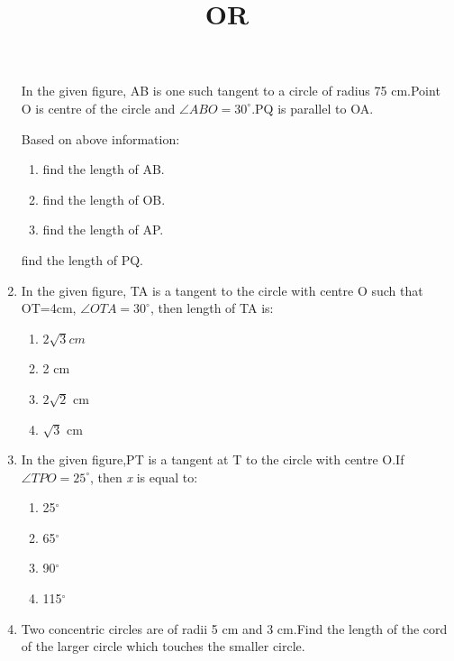 \documentclass[12pt,A4 paper]{article}
\begin{document}
\begin{enumerate}
In the given figure, AB is one such tangent to a circle of radius 75 cm.Point O is centre of the circle and $\angle ABO= 30^{\circ}$.PQ is parallel to OA.



\begin{figure}[ht]
	        \centering
	        
		\caption{}
		\label{fig:7}
        \end{figure}

     
Based on above information:

           \begin{enumerate}
             \item find the length of AB.
             \item find the length of OB.
             \item find the length of AP.
         \end{enumerate}
\begin{center}
\title{OR}
\end{center}
find the length of PQ.\\

\item In the given figure, TA is a tangent to the circle with centre O such that OT=4cm, $\angle OTA= 30 ^{\circ}$, then length of TA is:
      \begin{enumerate}
          \item $2\sqrt3 cm$
          \item 2 cm
          \item $2\sqrt2$ cm
          \item $\sqrt3$ cm
      \end{enumerate}




  \begin{figure}[h]
	\centering
	
	\caption{}
	\label{fig:8}
  \end{figure}
\pagebreak



\item In the given figure,PT is a tangent at T to the circle with centre O.If $\angle TPO=25^{\circ}$, then \textit{x} is equal to:
   \begin{enumerate}
       \item 25$^{\circ}$
       \item 65$^{\circ}$  
       \item 90$^{\circ}$
       \item 115$^{\circ}$
       
   \end{enumerate}




\begin{figure}[h]
	        \centering
	        
		\caption{}
		\label{fig:9}
\end{figure}
\pagebreak



\item Two concentric circles are of radii 5 cm and 3 cm.Find the length of the cord of the larger circle which touches the smaller circle.

         
\end{enumerate}
\end{document}
